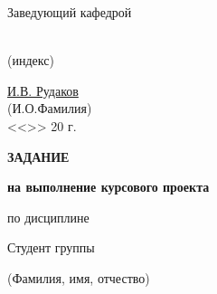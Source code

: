 \begin{titlepage}
\begin{adjustbox}{minipage=0.4\textwidth,valign=T,right}
    \begin{adjustbox}{minipage=0.7\textwidth}
        Заведующий кафедрой
    \end{adjustbox}
    \begin{adjustbox}{minipage=0.25\textwidth}
        \uline{\hfill}
    \end{adjustbox}\\
    \begin{adjustbox}{minipage=0.25\textwidth, right}
        \scriptsize
        \vspace{-1em}
        (индекс)
    \end{adjustbox}\\
    \begin{adjustbox}{minipage=0.4\textwidth}
        \vspace{.7em}
        \uline{\hfill}
    \end{adjustbox}
    \begin{adjustbox}{minipage=0.55\textwidth}
        \uline{\hfill И.В. Рудаков\hfill}
    \end{adjustbox}\\
    \begin{adjustbox}{minipage=0.45\textwidth, right}
        \scriptsize
        \vspace{-0.6em}
        (И.О.Фамилия)
    \end{adjustbox}\\
    \begin{adjustbox}{minipage=\textwidth, center}
        <<\uline{\hfill}>>\uline{\hfill\hfill\hfill} 20\uline{\hfill} г.
    \end{adjustbox}

\end{adjustbox}

\bigskip

\begin{center}
    \LARGE\textbf{ЗАДАНИЕ}

    \large\textbf{на выполнение курсового проекта}
    \small

    по дисциплине
    \uline{\hfill
        \wdiscipline
    \hfill}

    Студент группы
    \uline{\hfill
        \wgroup%
    \hfill}

    {\singlespacing%
    \uline{\hfill
	    \wauthorfull%
    \hfill}

    {\scriptsize\vspace{-0.3em} (Фамилия, имя, отчество)}
    }

    \vspace{1em}


\end{center}
\end{titlepage}
